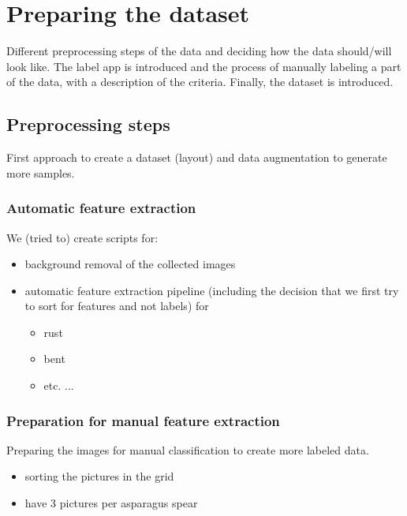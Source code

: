 \section{Preparing the dataset}

Different preprocessing steps of the data and deciding how the data should/will look like. The label app is introduced and the process of manually labeling a part of the data, with a description of the criteria. Finally, the dataset is introduced.


\subsection{Preprocessing steps}

First approach to create a dataset (layout) and data augmentation to generate more samples.


\subsubsection{Automatic feature extraction}

We (tried to) create scripts for:

\begin{itemize}
\item background removal of the collected images
\item automatic feature extraction pipeline (including the decision that we first try to sort for features and not labels) for

\begin{itemize}
\item rust
\item bent
\item etc. ...
\end{itemize}

\end{itemize}


\subsubsection{Preparation for manual feature extraction}

Preparing the images for manual classification to create more labeled data.

\begin{itemize}
\item sorting the pictures in the grid
\item have 3 pictures per asparagus spear
\end{itemize}


